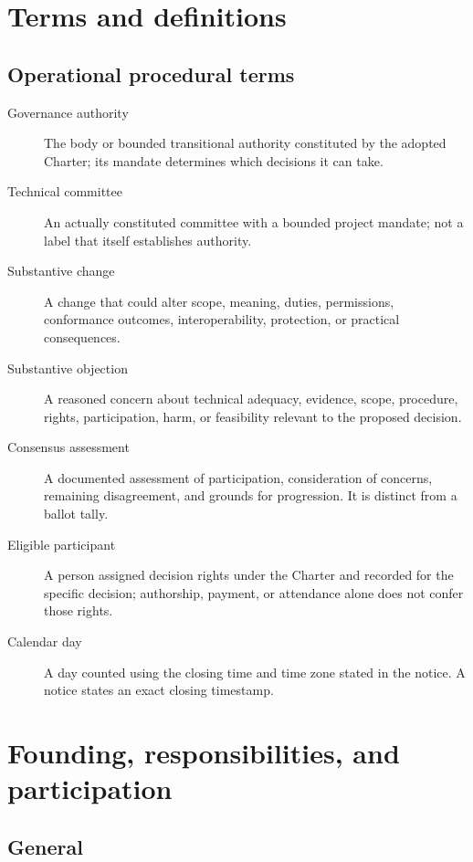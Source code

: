 \documentclass[11pt,a4paper]{article}
\begin{document}
\section{Terms and definitions}
\subsection{Operational procedural terms}
\begin{description}
\item[Governance authority] The body or bounded transitional authority constituted by the adopted Charter; its mandate determines which decisions it can take.
\item[Technical committee] An actually constituted committee with a bounded project mandate; not a label that itself establishes authority.
\item[Substantive change] A change that could alter scope, meaning, duties, permissions, conformance outcomes, interoperability, protection, or practical consequences.
\item[Substantive objection] A reasoned concern about technical adequacy, evidence, scope, procedure, rights, participation, harm, or feasibility relevant to the proposed decision.
\item[Consensus assessment] A documented assessment of participation, consideration of concerns, remaining disagreement, and grounds for progression. It is distinct from a ballot tally.
\item[Eligible participant] A person assigned decision rights under the Charter and recorded for the specific decision; authorship, payment, or attendance alone does not confer those rights.
\item[Calendar day] A day counted using the closing time and time zone stated in the notice. A notice states an exact closing timestamp.
\end{description}

\section{Founding, responsibilities, and participation}
\subsection{General}
\end{document}
